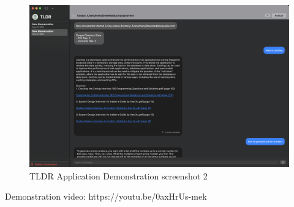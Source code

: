 \begin{figure}[h]
    \centering
    \includegraphics[width=1.0\linewidth]{images/result2.png}
    \caption{TLDR Application Demonstration screenshot 2}
    \label{fig:tldrAppDemoSc2}
\end{figure}

Demonstration video: https://youtu.be/0axHrUs-mek